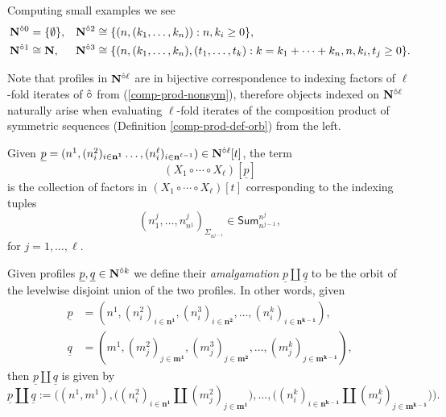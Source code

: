\begin{example}
\label{Nl-ex-1}Computing small examples we see \begin{align*}
\mathbf{N}^{\hat{\circ}0} & = \{\emptyset\},
&
\mathbf{N}^{\hat{\circ}2} & \cong \{ (n, (k_1,\dots,k_n)): n,k_i\geq 0\},
\\
\mathbf{N}^{\hat{\circ}1} & \cong \mathbf{N},
&
\mathbf{N}^{\hat{\circ}3} & \cong \{(n, (k_1,\dots,k_n), (t_1,\dots, t_k): k=k_1+\dots+k_n, n,k_i,t_j\geq 0\}. \nonumber
\end{align*}
\end{example}

\begin{remark}
Note that profiles in $\mathbf{N}^{\hat{\circ}\ell}$ are in bijective correspondence to indexing factors of $\ell$-fold iterates of $\hat{\circ}$ from (\ref{comp-prod-nonsym}), therefore objects indexed on $\mathbf{N}^{\hat{\circ}\ell}$ naturally arise when evaluating $\ell$-fold iterates of the composition product of symmetric sequences (Definition \ref{comp-prod-def-orb}) from the left. 
\end{remark}

Given $\underline{p}=(n^1, (n^2_i)_{i\in\mathbf{n^1}}\dots, (n^{\ell}_i)_{i\in\mathbf{n}^{\ell-1}})\in\mathbf{N}^{\hat{\circ}\ell}[t]$, the term \[(X_1\circ \cdots \circ X_{\ell})[\underline{p}]\] is the collection of factors in $(X_1\circ\cdots \circ X_{\ell})[t]$ corresponding to the indexing tuples \[(n^j_1,\dots,n^j_{n^1})_{\Sigma_{n^{j-1}}}\in\mathsf{Sum}_{n^{j-1}}^{n^j},\] for $j=1,\dots, \ell$.


\begin{definition} 
Given profiles $\underline{p},\underline{q}\in\mathbf{N}^{\hat{\circ}k}$ we define their \textit{amalgamation} $\underline{p}\amalg \underline{q}$ to be the orbit of the levelwise disjoint union of the two profiles. In other words, given \begin{align*} 
\underline{p} & =(n^1,(n^2_{i})_{i\in \mathbf{n^1}}, (n^3_{i})_{i\in \mathbf{n^2}},\dots, (n^{k}_{i})_{i\in \mathbf{n^{k-1}}}), \\
\underline{q} & =(m^1,(m^2_{j})_{j\in \mathbf{m^1}}, (m^3_{j})_{j\in \mathbf{m^2}},\dots, (m^{k}_{j})_{j\in \mathbf{m^{k-1}}}),
\end{align*}
then $\underline{p}\amalg\underline{q}$ is given by\begin{equation*}
\underline{p}\amalg \underline{q}:=\Big((n^1,m^1),\big( (n^2_{i})_{i\in \mathbf{n^1}} \amalg (m^2_{j})_{j\in \mathbf{m^1}} \big) , \dots, \big( (n^{k}_{i})_{i\in \mathbf{n^{k-1}}} \amalg (m^{k}_{j})_{j\in \mathbf{m^{k-1}}}\big) \Big).\end{equation*}
\end{definition}

